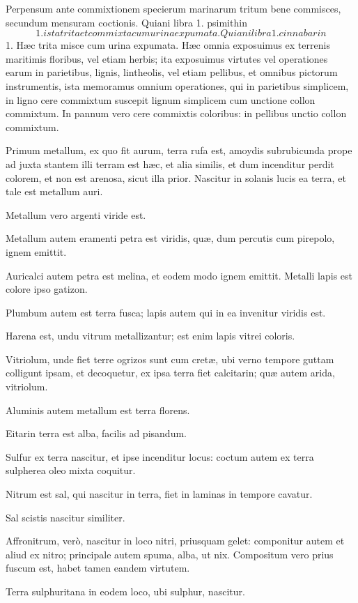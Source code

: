 \documentclass[a4paper, 11pt, oneside, polutonikogreek, italian]{article}
\newcommand*\svgaaa{}
\begin{document}
Perpensum ante commixtionem specierum marinarum tritum bene commisces, secundum mensuram coctionis. Quiani libra 1. psimithin $\svgaaa$ 1. ista trita et commixta cum urina expumata. Quiani libra 1. cinnabarin $\svgaaa$ 1. Hæc trita misce cum urina expumata. Hæc omnia exposuimus ex terrenis maritimis floribus, vel etiam herbis; ita exposuimus virtutes vel operationes earum in parietibus, lignis, lintheolis, vel etiam pellibus, et omnibus pictorum instrumentis, ista memoramus omnium operationes, qui in parietibus simplicem, in ligno cere commixtum suscepit lignum simplicem cum unctione collon commixtum. In pannum vero cere commixtis coloribus: in pellibus unctio collon commixtum.

Primum metallum, ex quo fit aurum, terra rufa est, amoydis subrubicunda prope ad juxta stantem illi terram est hæc, et alia similis, et dum incenditur perdit colorem, et non est arenosa, sicut illa prior. Nascitur in solanis lucis ea terra, et tale est metallum auri.

Metallum vero argenti viride est.

Metallum autem eramenti petra est viridis, quæ, dum percutis cum pirepolo, ignem emittit.

Auricalci autem petra est melina, et eodem modo ignem emittit. Metalli lapis est colore ipso gatizon.

Plumbum autem est terra fusca; lapis autem qui in ea invenitur viridis est.

Harena est, undu vitrum metallizantur; est enim lapis vitrei coloris.

Vitriolum, unde fiet terre ogrizos sunt cum cretæ, ubi verno tempore guttam colligunt ipsam, et decoquetur, ex ipsa terra fiet calcitarin; quæ autem arida, vitriolum.

Aluminis autem metallum est terra florens.

Eitarin terra est alba, facilis ad pisandum.

Sulfur ex terra nascitur, et ipse incenditur locus: coctum autem ex terra sulpherea oleo mixta coquitur.

Nitrum est sal, qui nascitur in terra, fiet in laminas in tempore cavatur.

Sal scistis nascitur similiter.

Affronitrum, verò, nascitur in loco nitri, priusquam gelet: componitur autem et aliud ex nitro; principale autem spuma, alba, ut nix. Compositum vero prius fuscum est, habet tamen eandem virtutem.

Terra sulphuritana in eodem loco, ubi sulphur, nascitur.
\end{document}
